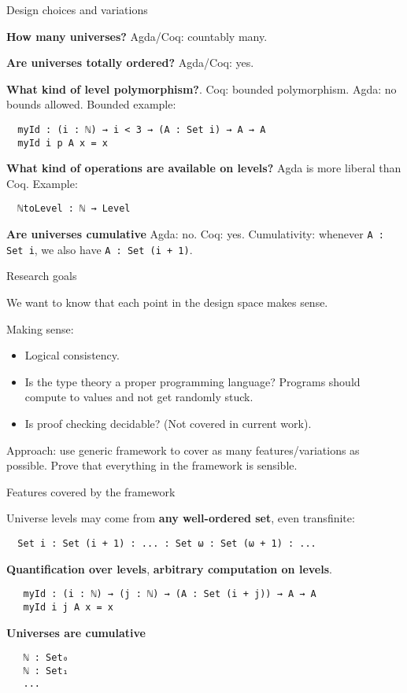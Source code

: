 \documentclass[dvipsnames,10pt,aspectratio=169]{beamer}
\begin{document}
\begin{frame}[fragile]{Design choices and variations}

\textbf{How many universes?} Agda/Coq: countably many.
\vspace{1em}

\textbf{Are universes totally ordered?} Agda/Coq: yes.
\vspace{1em}

\textbf{What kind of level polymorphism?}. Coq: bounded polymorphism. Agda: no
bounds allowed. Bounded example:
\begin{verbatim}
  myId : (i : ℕ) → i < 3 → (A : Set i) → A → A
  myId i p A x = x
\end{verbatim}

\textbf{What kind of operations are available on levels?} Agda is more liberal than Coq. Example:
\begin{verbatim}
  ℕtoLevel : ℕ → Level
\end{verbatim}


\textbf{Are universes cumulative} Agda: no. Coq: yes. Cumulativity: whenever \texttt{A : Set i}, we also have \texttt{A : Set (i + 1)}.

\end{frame}

\begin{frame}{Research goals}

We want to know that each point in the design space makes sense.
\vspace{1em}

Making sense:
\begin{itemize}
  \item Logical consistency.
  \item Is the type theory a proper programming language? Programs should compute to values
        and not get randomly stuck.
  \item Is proof checking decidable? (Not covered in current work).
\end{itemize}

Approach: use generic framework to cover as many features/variations as
possible. Prove that everything in the framework is sensible.


\end{frame}


\begin{frame}[fragile]{Features covered by the framework}

Universe levels may come from \textbf{any well-ordered set}, even transfinite:
\begin{verbatim}
  Set i : Set (i + 1) : ... : Set ω : Set (ω + 1) : ...
\end{verbatim}
\textbf{Quantification over levels}, \textbf{arbitrary computation on levels}.
\begin{verbatim}
   myId : (i : ℕ) → (j : ℕ) → (A : Set (i + j)) → A → A
   myId i j A x = x
\end{verbatim}
\textbf{Universes are cumulative}
\begin{verbatim}
   ℕ : Set₀
   ℕ : Set₁
   ...
\end{verbatim}

\end{frame}
\end{document}
